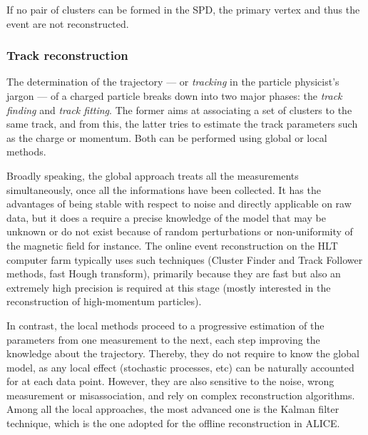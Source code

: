 If no pair of clusters can be formed in the SPD, the primary vertex and thus the event are not reconstructed.

\subsubsection{Track reconstruction}
\label{subsubsec:TrackReco}

The determination of the trajectory --- or \textit{tracking} in the particle physicist's jargon --- of a charged particle breaks down into two major phases: the \textit{track finding} and \textit{track fitting}. The former aims at associating a set of clusters to the same track, and from this, the latter tries to estimate the track parameters such as the charge or momentum. Both can be performed using global or local methods.

Broadly speaking, the global approach treats all the measurements simultaneously, once all the informations have been collected. It has the advantages of being stable with respect to noise and directly applicable on raw data, but it does a require a precise knowledge of the model that may be unknown or do not exist because of random perturbations or non-uniformity of the magnetic field for instance. The online event reconstruction on the HLT computer farm typically uses such techniques (Cluster Finder and Track Follower methods, fast Hough transform), primarily because they are fast but also an extremely high precision is required at this stage (mostly interested in the reconstruction of high-momentum particles).

In contrast, the local methods proceed to a progressive estimation of the parameters  from one measurement to the next, each step improving the knowledge about the trajectory. Thereby, they do not require to know the global model, as any local effect (stochastic processes, etc) can be naturally accounted for at each data point. However, they are also sensitive to the noise, wrong measurement or misassociation, and rely on complex reconstruction algorithms. Among all the local approaches, the most advanced one is the Kalman filter technique, which is the one adopted for the offline reconstruction in ALICE. 

